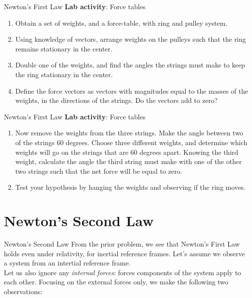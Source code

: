 \documentclass{beamer}
\begin{document}
\begin{frame}{Newton's First Law}
\small
\textbf{Lab activity}: Force tables
\begin{enumerate}
\item Obtain a set of weights, and a force-table, with ring and pulley system.
\item Using knowledge of vectors, arrange weights on the pulleys such that the ring remains stationary in the center.
\item Double one of the weights, and find the angles the strings must make to keep the ring stationary in the center.
\item Define the force vectors as vectors with magnitudes equal to the masses of the weights, in the directions of the strings.  Do the vectors add to zero?
\end{enumerate}
\end{frame}

\begin{frame}{Newton's First Law}
\small
\textbf{Lab activity}: Force tables
\begin{enumerate}
\item Now remove the weights from the three strings.  Make the angle between two of the strings 60 degrees.  Choose three different weights, and determine which weights will go on the strings that are 60 degrees apart.  Knowing the third weight, calculate the angle the third string must make with one of the other two strings such that the net force will be equal to zero.
\item Test your hypothesis by hanging the weights and observing if the ring moves.
\end{enumerate}
\end{frame}

\section{Newton's Second Law}

\begin{frame}{Newton's Second Law}
From the prior problem, we see that \alert{Newton's First Law} holds even under relativity, for inertial reference frames.  Let's assume we observe a system from an intertial reference frame. \\
\vspace{0.5cm}
Let us also ignore any \textit{internal forces}: forces components of the system apply to each other.  Focusing on the external forces only, we make the following two observations: \\
\end{frame}
\end{document}
